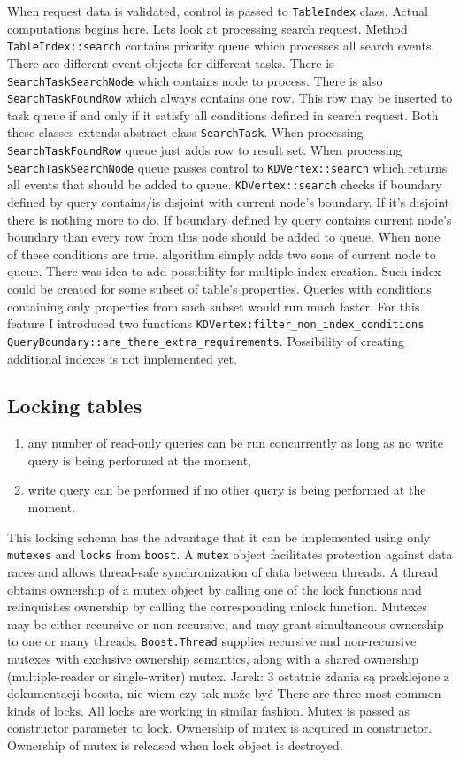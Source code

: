 \documentclass[10pt,a4paper]{article}
\newcommand{\jarek}[1]{\noindent\colorbox{myYellow}{Jarek: #1}}
\begin{document}
When request data is validated, control is passed to \verb|TableIndex| class. Actual computations begins here. Lets look at processing search request. Method \verb|TableIndex::search| contains priority queue which processes all search events. There are different event objects for different tasks. There is \verb|SearchTaskSearchNode| which contains node to process. There is also \verb|SearchTaskFoundRow| which always contains one row. This row may be inserted to task queue if and only if it satisfy all conditions defined in search request. Both these classes extends abstract class \verb|SearchTask|. When processing \verb|SearchTaskFoundRow| queue just adds row to result set. When processing \verb|SearchTaskSearchNode| queue passes control to \verb|KDVertex::search| which returns all events that should be added to queue. \verb|KDVertex::search| checks if boundary defined by query contains/is disjoint with current node's boundary. If it's disjoint there is nothing more to do. If boundary defined by query contains current node's boundary than every row from this node should be added to queue. When none of these conditions are true, algorithm simply adds two sons of current node to queue. There was idea to add possibility for multiple index creation. Such index could be created for some subset of table's properties. Queries with conditions containing only properties from such subset would run much faster. For this feature I introduced two functions \verb|KDVertex:filter_non_index_conditions| \verb|QueryBoundary::are_there_extra_requirements|. Possibility of creating additional indexes is not implemented yet.  

\subsection{Locking tables}
\begin{enumerate}
\item any number of read-only queries can be run concurrently as long as no write query is being performed at the moment,
\item write query can be performed if no other query is being performed at the moment.
\end{enumerate}

This locking schema has the advantage that it can be implemented using only \verb|mutexes| and \verb|locks| from \verb|boost|. A \verb|mutex| object facilitates protection against data races and allows thread-safe synchronization of data between threads. A thread obtains ownership of a mutex object by calling one of the lock functions and relinquishes ownership by calling the corresponding unlock function. Mutexes may be either recursive or non-recursive, and may grant simultaneous ownership to one or many threads. \verb|Boost.Thread| supplies recursive and non-recursive mutexes with exclusive ownership semantics, along with a shared ownership (multiple-reader or single-writer) mutex. \jarek{3 ostatnie zdania są przeklejone z dokumentacji boosta, nie wiem czy tak może być}
There are three most common kinds of locks. All locks are working in similar fashion. Mutex is passed as constructor parameter to lock. Ownership of mutex is acquired in constructor. Ownership of mutex is released when lock object is destroyed.  
\end{document}
